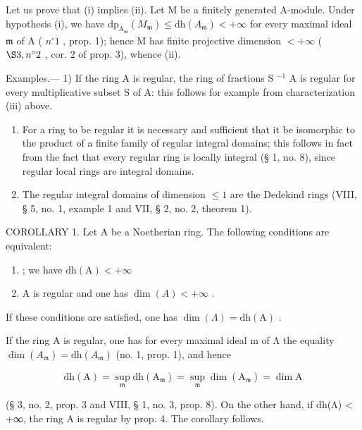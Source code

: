 Let us prove that (i) implies (ii). Let M be a finitely generated A-module. Under hypothesis (i), we have \(\mathrm{dp}_{\mathrm{A}_{\mathfrak{m}}}(M_{\mathfrak{m}}) \leqslant \mathrm{dh}(A_{\mathfrak{m}}) < +\infty\) for every maximal ideal \(\mathfrak{m}\) of A ( \(n^{\circ} 1\) , prop. 1); hence M has finite projective dimension \(< +\infty\) ( \(\S 3, n^{\circ} 2\) , cor. 2 of prop. 3), whence (ii).

Examples.--- 1) If the ring A is regular, the ring of fractions S \(^{-1}\) A is regular for every multiplicative subset S of A: this follows for example from characterization (iii) above.

\begin{enumerate}
\def\labelenumi{\arabic{enumi})}
\setcounter{enumi}{1}
\item
  For a ring to be regular it is necessary and sufficient that it be isomorphic to the product of a finite family of regular integral domains; this follows in fact from the fact that every regular ring is locally integral (§ 1, no. 8), since regular local rings are integral domains.
\item
  The regular integral domains of dimension \(\leqslant 1\) are the Dedekind rings (VIII, § 5, no. 1, example 1 and VII, § 2, no. 2, theorem 1).
\end{enumerate}

COROLLARY 1. Let A be a Noetherian ring. The following conditions are equivalent:

\begin{enumerate}
\def\labelenumi{(\roman{enumi})}
\item
  ; we have \(\mathrm{dh(A)} < +\infty\)
\item
  A is regular and one has \(\dim(A) < +\infty\) .
\end{enumerate}

If these conditions are satisfied, one has \(\dim(\Lambda) = \mathrm{d}\mathrm{h}(\mathrm{A})\) .

If the ring A is regular, one has for every maximal ideal m of Λ the equality \(\dim(A_{\mathfrak{m}}) = \mathrm{dh}(A_{\mathfrak{m}})\) (no. 1, prop. 1), and hence

\[
\mathrm{dh} (\mathrm{A}) = \sup _ {\mathfrak {m}} \mathrm{dh} (\mathrm{A} _ {\mathfrak {m}}) = \sup _ {\mathfrak {m}} \dim (\mathrm{A} _ {\mathfrak {m}}) = \dim \mathrm{A}
\]

(§ 3, no. 2, prop. 3 and VIII, § 1, no. 3, prop. 8). On the other hand, if dh(Λ) \textless{} +∞, the ring A is regular by prop. 4. The corollary follows.

